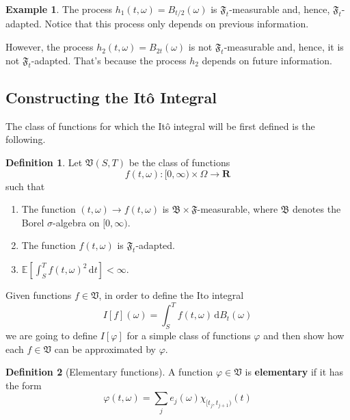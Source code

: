 \documentclass[12pt,a4paper]{article}
\theoremstyle{definition}
\newtheorem{example}{Example}[section]
\newtheorem{definition}{Definition}[section]
\begin{document}
\begin{example}
	The process $h_1(t, \omega) = B_{t/2}(\omega)$ is $\mathfrak{F}_t$-measurable and, hence, $\mathfrak{F}_t$-adapted. Notice that this process only depends on previous information.
	
	However, the process $h_2(t, \omega) = B_{2t}(\omega)$ is not $\mathfrak{F}_t$-measurable and, hence, it is not $\mathfrak{F}_t$-adapted. That's because the process $h_2$ depends on future information.
\end{example}

%
%

\subsection{Constructing the Itô Integral}

The class of functions for which the Itô integral will be first defined is the following.

\begin{definition}\label{def:ito-class}
	Let $\mathfrak{V}(S,T)$ be the class of functions
	\[
		f(t, \omega) : [0, \infty) \times \Omega \longrightarrow \textbf{R}
	\]
	such that
	\begin{enumerate}
		\item The function $(t, \omega) \longrightarrow f(t, \omega)$ is $\mathfrak{B} \times \mathfrak{F}$-measurable, where $\mathfrak{B}$ denotes the Borel $\sigma$-algebra on $[0, \infty)$.
		\item The function $f(t,\omega)$ is $\mathfrak{F}_t$-adapted.
		\item $\mathbb{E} \left[ \int_S^T f(t, \omega)^2 \, \mathrm{d}t \right] < \infty$.
	\end{enumerate}
\end{definition}

Given functions $f \in \mathfrak{V}$, in order to define the Ito integral
\[
	I[f](\omega) = \int_S^T f(t, \omega)\, \mathrm{d}B_t(\omega)
\]
we are going to define $I[\varphi]$ for a simple class of functions $\varphi$ and then show how each $f \in \mathfrak{V}$ can be approximated by $\varphi$.

\begin{definition}[Elementary functions]
	A function $\varphi \in \mathfrak{V}$ is \textbf{elementary} if it has the form
\[
	\varphi(t, \omega) = \sum_j e_j(\omega) \chi_{[t_j, t_{j+1})}(t)
\]
\end{definition}
\end{document}
